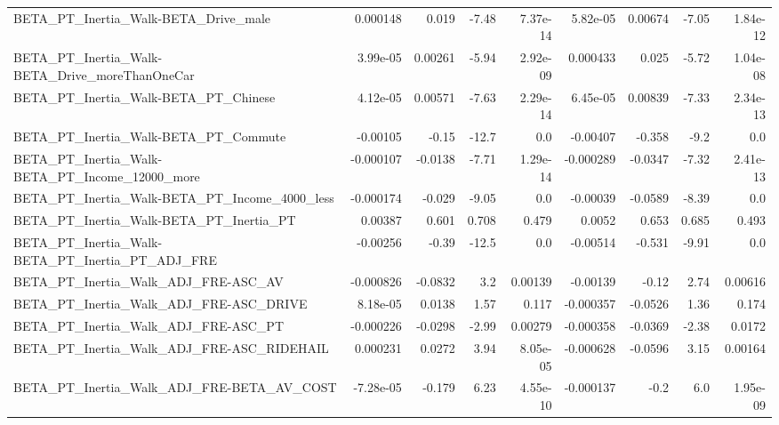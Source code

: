 \begin{tabular}{lrrrrrrrr}
BETA\_PT\_Inertia\_Walk-BETA\_Drive\_male               &    0.000148 &        0.019 &    -7.48 & 7.37e-14 &   5.82e-05 &     0.00674 &        -7.05 &      1.84e-12 \\
BETA\_PT\_Inertia\_Walk-BETA\_Drive\_moreThanOneCar     &    3.99e-05 &      0.00261 &    -5.94 & 2.92e-09 &   0.000433 &       0.025 &        -5.72 &      1.04e-08 \\
BETA\_PT\_Inertia\_Walk-BETA\_PT\_Chinese               &    4.12e-05 &      0.00571 &    -7.63 & 2.29e-14 &   6.45e-05 &     0.00839 &        -7.33 &      2.34e-13 \\
BETA\_PT\_Inertia\_Walk-BETA\_PT\_Commute               &    -0.00105 &        -0.15 &    -12.7 &      0.0 &   -0.00407 &      -0.358 &         -9.2 &           0.0 \\
BETA\_PT\_Inertia\_Walk-BETA\_PT\_Income\_12000\_more     &   -0.000107 &      -0.0138 &    -7.71 & 1.29e-14 &  -0.000289 &     -0.0347 &        -7.32 &      2.41e-13 \\
BETA\_PT\_Inertia\_Walk-BETA\_PT\_Income\_4000\_less      &   -0.000174 &       -0.029 &    -9.05 &      0.0 &   -0.00039 &     -0.0589 &        -8.39 &           0.0 \\
BETA\_PT\_Inertia\_Walk-BETA\_PT\_Inertia\_PT            &     0.00387 &        0.601 &    0.708 &    0.479 &     0.0052 &       0.653 &        0.685 &         0.493 \\
BETA\_PT\_Inertia\_Walk-BETA\_PT\_Inertia\_PT\_ADJ\_FRE    &    -0.00256 &        -0.39 &    -12.5 &      0.0 &   -0.00514 &      -0.531 &        -9.91 &           0.0 \\
BETA\_PT\_Inertia\_Walk\_ADJ\_FRE-ASC\_AV                &   -0.000826 &      -0.0832 &      3.2 &  0.00139 &   -0.00139 &       -0.12 &         2.74 &       0.00616 \\
BETA\_PT\_Inertia\_Walk\_ADJ\_FRE-ASC\_DRIVE             &    8.18e-05 &       0.0138 &     1.57 &    0.117 &  -0.000357 &     -0.0526 &         1.36 &         0.174 \\
BETA\_PT\_Inertia\_Walk\_ADJ\_FRE-ASC\_PT                &   -0.000226 &      -0.0298 &    -2.99 &  0.00279 &  -0.000358 &     -0.0369 &        -2.38 &        0.0172 \\
BETA\_PT\_Inertia\_Walk\_ADJ\_FRE-ASC\_RIDEHAIL          &    0.000231 &       0.0272 &     3.94 & 8.05e-05 &  -0.000628 &     -0.0596 &         3.15 &       0.00164 \\
BETA\_PT\_Inertia\_Walk\_ADJ\_FRE-BETA\_AV\_COST          &   -7.28e-05 &       -0.179 &     6.23 & 4.55e-10 &  -0.000137 &        -0.2 &          6.0 &      1.95e-09 \\

\end{tabular}
